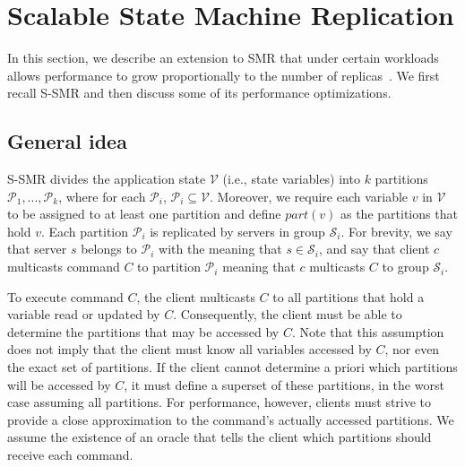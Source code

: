 \documentclass[11pt]{article}
\newcommand{\ppm}{\mathcal{P}}
\newcommand{\vvm}{\mathcal{V}}
\newcommand{\ssm}{\mathcal{S}}
\begin{document}


\section{Scalable State Machine Replication}
\label{sec:scalablesmr}

In this section, we describe an extension to SMR that under certain workloads allows performance to grow proportionally to the number of replicas~\cite{bezerra2014ssmr}.
We first recall  S-SMR and then discuss some of its performance optimizations.

\subsection{General idea}
\label{sec:generalidea}

S-SMR divides the application state $\vvm$ (i.e., state variables) into $k$ partitions $\ppm_1, ..., \ppm_k$, where for each $\ppm_i$, $\ppm_i \subseteq \vvm$.
Moreover, we require each variable $v$ in $\vvm$ to be assigned to at least one partition and define $part(v)$ as the partitions that hold $v$.
Each partition $\ppm_i$ is replicated by servers in group $\ssm_i$.
For brevity, we say that server $s$ belongs to $\ppm_i$ with the meaning that $s \in \ssm_i$, and say that client $c$ multicasts command $C$ to partition $\ppm_i$ meaning that $c$ multicasts $C$ to group $\ssm_i$.

To execute command $C$, the client multicasts $C$ to all partitions that hold a variable read or updated by $C$.
Consequently, the client must be able to determine the partitions that may be accessed by $C$.
Note that this assumption does not imply that the client must know all variables accessed by $C$, nor even the exact set of partitions.
If the client cannot determine a priori which partitions will be accessed by $C$, it must define a superset of these partitions, in the worst case assuming all partitions.
For performance, however, clients must strive to provide a close approximation to the command's actually accessed partitions.
We assume the existence of an oracle that tells the client which partitions should receive each command.
\end{document}
